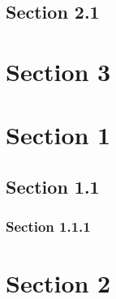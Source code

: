 \subsection{\hypertarget{_section_2.1}{Section 2.1}}
\section{\hypertarget{_section_3}{Section 3}}

\section{\hypertarget{_section_1}{Section 1}}
\subsection{\hypertarget{_section_1.1}{Section 1.1}}
\subsubsection{\hypertarget{_section_1.1.1}{Section 1.1.1}}
\section{\hypertarget{_section_2}{Section 2}}
